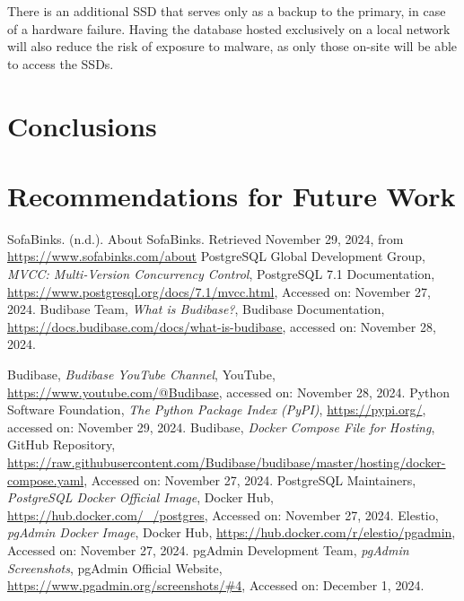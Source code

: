 \documentclass{article}
\begin{document}
There is an additional SSD that serves only as a backup to the primary, in case of a hardware failure.  Having the database hosted 
exclusively on a local network will also reduce the risk of exposure to malware, as only those on-site will be able to 
access the SSDs.  
\section{Conclusions}

\section{Recommendations for Future Work}

\clearpage
\begin{thebibliography}{99}
 SofaBinks. (n.d.). 
    About SofaBinks. Retrieved November 29, 2024, from \url{https://www.sofabinks.com/about}
 PostgreSQL Global Development Group, \textit{MVCC: Multi-Version Concurrency Control}, 
    PostgreSQL 7.1 Documentation, \url{https://www.postgresql.org/docs/7.1/mvcc.html}, Accessed on: November 27, 2024.
Budibase Team, 
\textit{What is Budibase?}, Budibase Documentation, 
\url{https://docs.budibase.com/docs/what-is-budibase}, 
accessed on: November 28, 2024.

Budibase, 
\textit{Budibase YouTube Channel}, YouTube, 
\url{https://www.youtube.com/@Budibase}, 
accessed on: November 28, 2024.
Python Software Foundation, 
\textit{The Python Package Index (PyPI)}, 
\url{https://pypi.org/}, 
accessed on: November 29, 2024.
 Budibase, \textit{Docker Compose File for Hosting}, 
GitHub Repository, \url{https://raw.githubusercontent.com/Budibase/budibase/master/hosting/docker-compose.yaml}, 
Accessed on: November 27, 2024.
 PostgreSQL Maintainers, 
\textit{PostgreSQL Docker Official Image}, Docker Hub, 
\url{https://hub.docker.com/_/postgres}, 
Accessed on: November 27, 2024.
 Elestio, 
\textit{pgAdmin Docker Image}, Docker Hub, 
\url{https://hub.docker.com/r/elestio/pgadmin}, 
Accessed on: November 27, 2024.
 pgAdmin Development Team, 
\textit{pgAdmin Screenshots}, pgAdmin Official Website, 
\url{https://www.pgadmin.org/screenshots/#4}, 
Accessed on: December 1, 2024.
\end{thebibliography}


\end{document}

